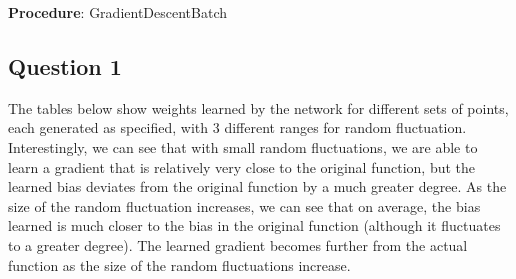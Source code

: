 \documentclass{article}
\begin{document}
\begin{algorithm}[H]{\textbf{Procedure}: GradientDescentBatch} \\
    \SetAlgoLined
\end{algorithm}
\vspace{4mm}
\subsection*{Question 1}

The tables below show weights learned by the network for different sets of points, each generated as specified, with 3 different ranges for random fluctuation. Interestingly, we can see that with small random fluctuations, we are able to learn a gradient that is relatively very close to the original function, but the learned bias deviates from the original function by a much greater degree. As the size of the random fluctuation increases, we can see that on average, the bias learned is much closer to the bias in the original function (although it fluctuates to a greater degree). The learned gradient becomes further from the actual function as the size of the random fluctuations increase.
\end{document}
